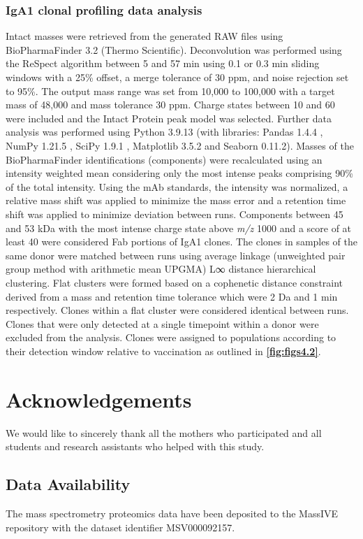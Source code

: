 \subsubsection{IgA1 clonal profiling data analysis}
Intact masses were retrieved from the generated RAW files using BioPharmaFinder 3.2 (Thermo Scientific). Deconvolution was performed using the ReSpect algorithm between 5 and 57 min using 0.1 or 0.3 min sliding windows with a 25\% offset, a merge tolerance of 30 ppm, and noise rejection set to 95\%. The output mass range was set from 10,000 to 100,000 with a target mass of 48,000 and mass tolerance 30 ppm. Charge states between 10 and 60 were included and the Intact Protein peak model was selected.
Further data analysis was performed using Python 3.9.13 (with libraries: Pandas 1.4.4 \cite{mckinney2010data}, NumPy 1.21.5 \cite{walt2011numpy}, SciPy 1.9.1 \cite{virtanen2020scipy}, Matplotlib 3.5.2 \cite{hunter2007matplotlib:} and Seaborn 0.11.2). Masses of the BioPharmaFinder identifications (components) were recalculated using an intensity weighted mean considering only the most intense peaks comprising 90\% of the total intensity. Using the mAb standards, the intensity was normalized, a relative mass shift was applied to minimize the mass error and a retention time shift was applied to minimize deviation between runs.
Components between 45 and 53 kDa with the most intense charge state above \emph{m/z} 1000 and a score of at least 40 were considered Fab portions of IgA1 clones. The clones in samples of the same donor were matched between runs using average linkage (unweighted pair group method with arithmetic mean UPGMA) L∞ distance hierarchical clustering. Flat clusters were formed based on a cophenetic distance constraint derived from a mass and retention time tolerance which were 2 Da and 1 min respectively. Clones within a flat cluster were considered identical between runs. Clones that were only detected at a single timepoint within a donor were excluded from the analysis. Clones were assigned to populations according to their detection window relative to vaccination as outlined in \textbf{\autoref{fig:figs4.2}}.

\section{Acknowledgements}
We would like to sincerely thank all the mothers who participated and all students and research assistants who helped with this study.

\subsection{Data Availability}
The mass spectrometry proteomics data have been deposited to the MassIVE repository with the dataset identifier MSV000092157.



